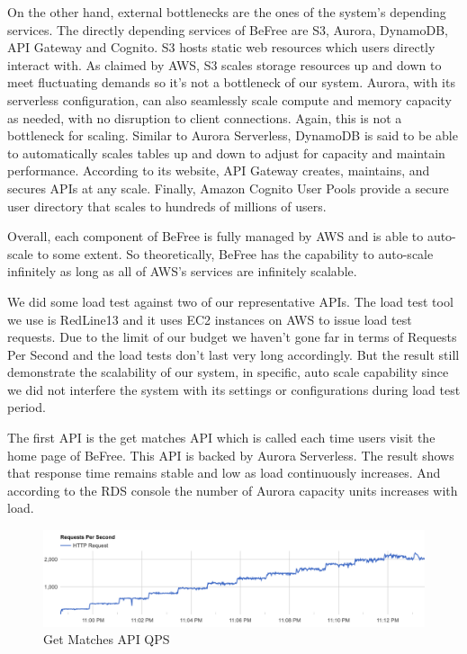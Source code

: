 \documentclass[conference]{IEEEtran}
\begin{document}
On the other hand, external bottlenecks are the ones of the system's depending services. The directly depending services of BeFree are S3, Aurora, DynamoDB, API Gateway and Cognito. S3 hosts static web resources which users directly interact with. As claimed by AWS, S3 scales storage resources up and down to meet fluctuating demands so it's not a bottleneck of our system. Aurora, with its serverless configuration, can also seamlessly scale compute and memory capacity as needed, with no disruption to client connections. Again, this is not a bottleneck for scaling. Similar to Aurora Serverless, DynamoDB is said to be able to automatically scales tables up and down to adjust for capacity and maintain performance. According to its website, API Gateway creates, maintains, and secures APIs at any scale. Finally, Amazon Cognito User Pools provide a secure user directory that scales to hundreds of millions of users.

Overall, each component of BeFree is fully managed by AWS and is able to auto-scale to some extent. So theoretically, BeFree has the capability to auto-scale infinitely as long as all of AWS's services are infinitely scalable.

We did some load test against two of our representative APIs. The load test tool we use is RedLine13 \cite{b19} and it uses EC2 instances on AWS to issue load test requests. Due to the limit of our budget we haven't gone far in terms of Requests Per Second and the load tests don't last very long accordingly. But the result still demonstrate the scalability of our system, in specific, auto scale capability since we did not interfere the system with its settings or configurations during load test period.

The first API is the get matches API which is called each time users visit the home page of BeFree. This API is backed by Aurora Serverless. The result shows that response time remains stable and low as load continuously increases. And according to the RDS console the number of Aurora capacity units increases with load.

\begin{figure}[htbp]
 \centerline{\includegraphics[scale=0.26]{matches-qps.png}}
\caption{Get Matches API QPS}
\end{figure}
\end{document}

